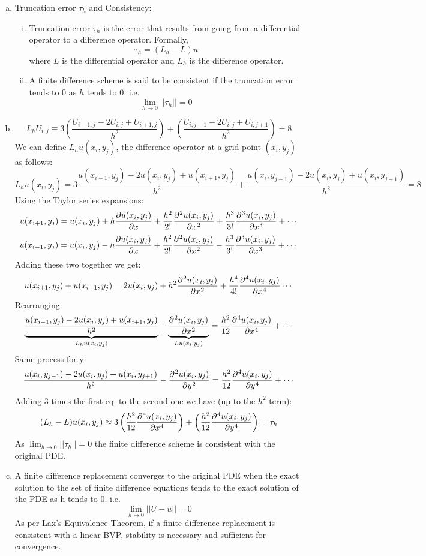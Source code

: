 \documentclass[fleqn]{article}
\begin{document}
\begin{enumerate}[a)]
\item Truncation error $\tau_h$ and Consistency:
\begin{enumerate}[i)]
    \item Truncation error $\tau_h$ is the error that results from going from a differential operator to a difference operator. Formally,
    \[\tau_h = (L_h - L)u\]
    where $L$ is the differential operator and $L_h$ is the difference operator.
    \item A finite difference scheme is said to be consistent if the truncation error tends to 0 as $h$ tends to 0. i.e.
    \[\lim_{h\to 0} ||\tau_h|| = 0\]
\end{enumerate}
\item \[L_h U_{i,j} \equiv 3 \left ( \frac{U_{i-1,j} - 2U_{i,j} + U_{i+1,j}}{h^2} \right )+ \left ( \frac{U_{i,j-1} - 2U_{i,j} + U_{i,j+1}}{h^2} \right ) = 8\]
We can define $L_hu(x_i,y_j)$, the difference operator at a grid point $(x_i, y_j)$ as follows:
\[L_hu(x_i,y_j) = 3\frac{u(x_{i-1},y_j)-2u(x_i,y_j)+u(x_{i+1},y_j)}{h^2} + \frac{u(x_{i},y_{j-1})-2u(x_i,y_j)+u(x_{i},y_{j+1})}{h^2} = 8\]
Using the Taylor series expansions:
\[u(x_{i+1},y_j) = u(x_i,y_j)+h\diffp{u(x_i,y_j)}{x}+\frac{h^2}{2!}\diffp[2]{u(x_i,y_j)}{x}+\frac{h^3}{3!}\diffp[3]{u(x_i,y_j)}{x}+\cdots \]
\[u(x_{i-1},y_j) = u(x_i,y_j)-h\diffp{u(x_i,y_j)}{x}+\frac{h^2}{2!}\diffp[2]{u(x_i,y_j)}{x}-\frac{h^3}{3!}\diffp[3]{u(x_i,y_j)}{x}+\cdots \]
Adding these two together we get:
\[u(x_{i+1},y_j)+u(x_{i-1},y_j) = 2u(x_i,y_j)+h^2\diffp[2]{u(x_i,y_j)}{x}+\frac{h^4}{4!}\diffp[4]{u(x_i,y_j)}{x}\cdots\]
Rearranging:
\[\underbrace{\frac{u(x_{i-1},y_j)-2u(x_i,y_j)+u(x_{i+1},y_j)}{h^2}}_{L_hu(x_i,y_j)}-\underbrace{\diffp[2]{u(x_i,y_j)}{x}}_{Lu(x_i,y_j)} = \frac{h^2}{12}\diffp[4]{u(x_i,y_j)}{x}+\cdots\]
Same process for y:
\[\frac{u(x_{i},y_{j-1})-2u(x_i,y_j)+u(x_{i},y_{j+1})}{h^2}-\diffp[2]{u(x_i,y_j)}{y} = \frac{h^2}{12}\diffp[4]{u(x_i,y_j)}{y}+\cdots\]
Adding 3 times the first eq. to the second one we have (up to the $h^2$ term):
\[(L_h-L)u(x_i,y_j) \approx 3\left(\frac{h^2}{12}\diffp[4]{u(x_i,y_j)}{x}\right)+\left(\frac{h^2}{12}\diffp[4]{u(x_i,y_j)}{y}\right) = \tau_h\]
As \(\lim_{h\to0}||\tau_h|| = 0\) the finite difference scheme is consistent with the original PDE.
\item A finite difference replacement converges to the original PDE when the exact solution to the set of finite difference equations tends to the exact solution of the PDE as h tends to 0. i.e.
\[\lim_{h\to0}||U-u|| = 0\]
As per Lax's Equivalence Theorem, if a finite difference replacement is consistent with a linear BVP, stability is necessary and sufficient for convergence. 
\end{enumerate}
\end{document}
